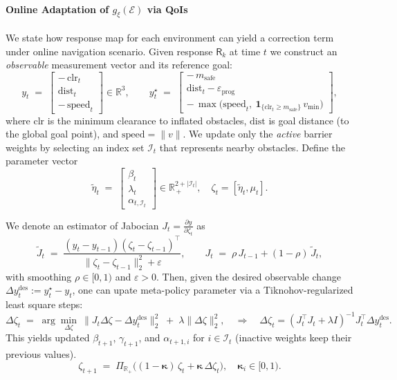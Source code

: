 \documentclass{article} %
\let\vec=\boldsymbol
\begin{document}
\paragraph{Online Adaptation of $g_{\xi}(\mathcal{E})$ via QoIs}
We state how response map for each environment can yield a correction term under online navigation scenario. Given response $\mathsf{R}_k$ at time $t$ we construct an \emph{observable} measurement vector and its reference goal:
\[
y_t \;=\; \begin{bmatrix}
-\,\mathrm{clr}_t \\[2pt]
\mathrm{dist}_t \\[2pt]
-\,\mathrm{speed}_t
\end{bmatrix}\in\mathbb R^3,
\qquad
y_t^\star \;=\; \begin{bmatrix}
-\,m_{\mathrm{safe}}\\[2pt]
\mathrm{dist}_t-\varepsilon_{\mathrm{prog}}\\[2pt]
-\,\max\big(\mathrm{speed}_t,\ \mathbf 1_{\{\mathrm{clr}_t\ge m_{\mathrm{safe}}\}}\,v_{\min}\big)
\end{bmatrix},
\]
where $\mathrm{clr}$ is the minimum clearance to inflated obstacles, $\mathrm{dist}$ is goal distance (to the global goal point), and $\mathrm{speed}=\|v\|$.  
We update only the \emph{active} barrier weights by selecting an index set $\mathcal I_t$ that represents nearby obstacles. Define the parameter vector
\[
\tilde{\eta}_t\;=\;\begin{bmatrix}\beta_t\\ \lambda_t\\\alpha_{t,\mathcal I_t} \end{bmatrix}\in\mathbb R^{2+|\mathcal I_t|}_{\,+}, \quad \zeta_t=[\tilde{\eta}_t,\mu_t].
\]

We denote an estimator of Jabocian $J_t=\frac{\partial y}{\partial \zeta_t}$ as  
\[
\widetilde J_t\;=\;\frac{(y_t-y_{t-1})(\zeta_t-\zeta_{t-1})^\top}{\|\zeta_t-\zeta_{t-1}\|_2^2+\varepsilon},
\qquad
J_t\;=\;\rho\,J_{t-1}+(1-\rho)\,\widetilde J_t,
\]
with smoothing $\rho\in[0,1)$ and $\varepsilon>0$. Then, given the desired observable change $\Delta y^{\mathrm{des}}_t:=y_t^\star-y_t$, one can upate meta-policy parameter via a Tiknohov-regularized least square steps:
\[
\Delta\zeta_t \;=\; \arg\min_{\Delta\zeta}\ \big\|J_t\Delta\zeta-\Delta y^{\mathrm{des}}_t\big\|_2^2
\;+\;\lambda\|\Delta\zeta\|_2^2,
\quad\Rightarrow\quad
\Delta\zeta_t=(J_t^\top J_t+\lambda I)^{-1}J_t^\top\Delta y^{\mathrm{des}}_t.
\]
This yields updated $\beta_{t+1}$, $\gamma_{t+1}$, and $\alpha_{t+1,i}$ for $i\in\mathcal I_t$ (inactive weights keep their previous values).
\[
\zeta_{t+1}\;=\;\Pi_{\mathbb R_+}\big((1-\vec{\kappa})\,\zeta_t+ \vec{\kappa}\,\Delta\zeta_{t}\big),\quad \vec{\kappa}_i\in[0,1).
\]
\end{document}
